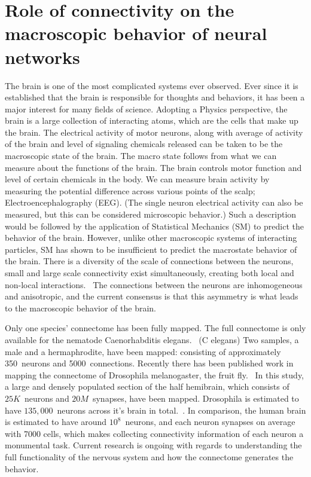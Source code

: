 \documentclass[../dissertation.tex]{subfiles}
\begin{document}

\newpage

\section{Role of connectivity on the macroscopic behavior of neural networks} \label{sec:intro}

The brain is one of the most complicated systems ever observed.
Ever since it is established that the brain is responsible for thoughts and behaviors, it has been a major interest for many fields of science.
Adopting a Physics perspective, the brain is a large collection of interacting atoms, which are the cells that make up the brain.
The electrical activity of motor neurons, along with average of activity of the brain and level of signaling chemicals released can be taken to be the macroscopic state of the brain.
The macro state follows from what we can measure about the functions of the brain.
The brain controls motor function and level of certain chemicals in the body.
We can measure brain activity by measuring the potential difference across various points of the scalp; Electroencephalography (EEG).
(The single neuron electrical activity can also be measured, but this can be considered microscopic behavior.)
Such a description would be followed by the application of Statistical Mechanics (SM) to predict the behavior of the brain.
However, unlike other macroscopic systems of interacting particles, SM has shown to be insufficient to predict the macrostate behavior of the brain.
There is a diversity of the scale of connections between the neurons, small and large scale connectivity exist simultaneously, creating both local and non-local interactions.~\cite{Ouyang.etal2017}
The connections between the neurons are inhomogeneous and anisotropic, and the current consensus is that this asymmetry is what leads to the macroscopic behavior of the brain.

Only one species' connectome has been fully mapped.
The full connectome is only available for the nematode Caenorhabditis elegans.~\cite{Cook.etal2019} (C elegans)
Two samples, a male and a hermaphrodite, have been mapped: consisting of approximately 350~neurons and 5000~connections.
Recently there has been published work in mapping the connectome of Drosophila melanogaster, the fruit fly.~\cite{Scheffer.etal2020}
In this study, a large and densely populated section of the half hemibrain, which consists of $25K$~neurons and $20M$~synapses, have been mapped.
Drosophila is estimated to have $135,000$~neurons across it's brain in total.~\cite{Alivisatos.etal2012}.
In comparison, the human brain is estimated to have around $10^{8}$~neurons, and each neuron synapses on average with 7000 cells, which makes collecting connectivity information of each neuron a monumental task.
Current research is ongoing with regards to understanding the full functionality of the nervous system and how the connectome generates the behavior.~\cite{Bhattasali.etal2022}
\end{document}
